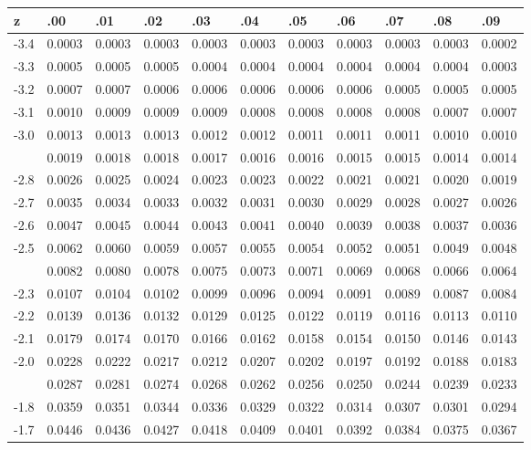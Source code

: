 \documentclass[
]{article}
\begin{document}
\begin{longtable}[t]{lllllllllll}
\toprule
z & .00 & .01 & .02 & .03 & .04 & .05 & .06 & .07 & .08 & .09\\
\midrule
-3.4 & 0.0003 & 0.0003 & 0.0003 & 0.0003 & 0.0003 & 0.0003 & 0.0003 & 0.0003 & 0.0003 & 0.0002\\
-3.3 & 0.0005 & 0.0005 & 0.0005 & 0.0004 & 0.0004 & 0.0004 & 0.0004 & 0.0004 & 0.0004 & 0.0003\\
-3.2 & 0.0007 & 0.0007 & 0.0006 & 0.0006 & 0.0006 & 0.0006 & 0.0006 & 0.0005 & 0.0005 & 0.0005\\
-3.1 & 0.0010 & 0.0009 & 0.0009 & 0.0009 & 0.0008 & 0.0008 & 0.0008 & 0.0008 & 0.0007 & 0.0007\\
-3.0 & 0.0013 & 0.0013 & 0.0013 & 0.0012 & 0.0012 & 0.0011 & 0.0011 & 0.0011 & 0.0010 & 0.0010\\
\addlinespace
-2.9 & 0.0019 & 0.0018 & 0.0018 & 0.0017 & 0.0016 & 0.0016 & 0.0015 & 0.0015 & 0.0014 & 0.0014\\
-2.8 & 0.0026 & 0.0025 & 0.0024 & 0.0023 & 0.0023 & 0.0022 & 0.0021 & 0.0021 & 0.0020 & 0.0019\\
-2.7 & 0.0035 & 0.0034 & 0.0033 & 0.0032 & 0.0031 & 0.0030 & 0.0029 & 0.0028 & 0.0027 & 0.0026\\
-2.6 & 0.0047 & 0.0045 & 0.0044 & 0.0043 & 0.0041 & 0.0040 & 0.0039 & 0.0038 & 0.0037 & 0.0036\\
-2.5 & 0.0062 & 0.0060 & 0.0059 & 0.0057 & 0.0055 & 0.0054 & 0.0052 & 0.0051 & 0.0049 & 0.0048\\
\addlinespace
-2.4 & 0.0082 & 0.0080 & 0.0078 & 0.0075 & 0.0073 & 0.0071 & 0.0069 & 0.0068 & 0.0066 & 0.0064\\
-2.3 & 0.0107 & 0.0104 & 0.0102 & 0.0099 & 0.0096 & 0.0094 & 0.0091 & 0.0089 & 0.0087 & 0.0084\\
-2.2 & 0.0139 & 0.0136 & 0.0132 & 0.0129 & 0.0125 & 0.0122 & 0.0119 & 0.0116 & 0.0113 & 0.0110\\
-2.1 & 0.0179 & 0.0174 & 0.0170 & 0.0166 & 0.0162 & 0.0158 & 0.0154 & 0.0150 & 0.0146 & 0.0143\\
-2.0 & 0.0228 & 0.0222 & 0.0217 & 0.0212 & 0.0207 & 0.0202 & 0.0197 & 0.0192 & 0.0188 & 0.0183\\
\addlinespace
-1.9 & 0.0287 & 0.0281 & 0.0274 & 0.0268 & 0.0262 & 0.0256 & 0.0250 & 0.0244 & 0.0239 & 0.0233\\
-1.8 & 0.0359 & 0.0351 & 0.0344 & 0.0336 & 0.0329 & 0.0322 & 0.0314 & 0.0307 & 0.0301 & 0.0294\\
-1.7 & 0.0446 & 0.0436 & 0.0427 & 0.0418 & 0.0409 & 0.0401 & 0.0392 & 0.0384 & 0.0375 & 0.0367\\

\end{longtable}
\end{document}
